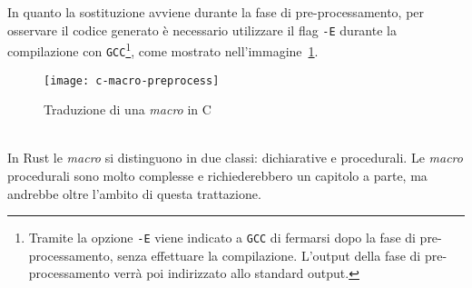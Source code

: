 In quanto la sostituzione avviene durante la fase di pre-processamento,
per osservare il codice generato è necessario utilizzare il flag \texttt{-E} durante la compilazione con
 \texttt{GCC}\footnote{Tramite la opzione \texttt{-E} viene indicato a \texttt{GCC} di fermarsi dopo la fase di pre-processamento, 
 senza effettuare la compilazione. L'output della fase di pre-processamento verrà poi indirizzato allo standard output.}, 
 come mostrato nell'immagine~\ref{c:macro-preprocess}. \hfill
\begin{figure}[htbp]
    \begin{center}
        \texttt{[image: c-macro-preprocess]}
        \caption{Traduzione di una \textit{macro} in C}\label{c:macro-preprocess}
    \end{center}
\end{figure}
\vspace{10pt}\\
\noindent In Rust le \textit{macro} si distinguono in due classi: dichiarative e procedurali. Le \textit{macro} procedurali sono molto complesse e richiederebbero un capitolo
a parte, ma andrebbe oltre l'ambito di questa trattazione. 

